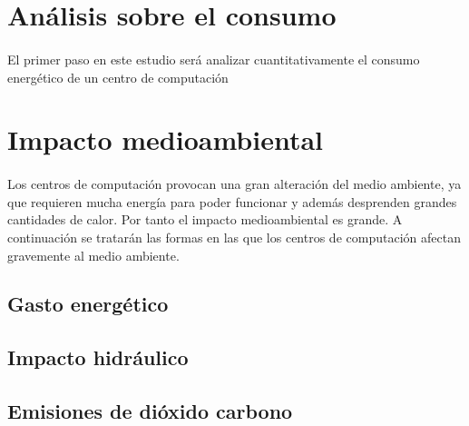 \documentclass[10pt]{article}
\begin{document}
    \section{Análisis sobre el consumo}
    \label{sec:analisis}
    	\paragraph{}
		El primer paso en este estudio será analizar cuantitativamente el consumo energético de un centro de computación

    \section{Impacto medioambiental}
	\label{sec:impacto}

        \paragraph{}
		Los centros de computación provocan una gran alteración del medio ambiente, ya que requieren mucha energía para poder funcionar y además desprenden grandes cantidades de calor. Por tanto el impacto medioambiental es grande. A continuación se tratarán las formas en las que los centros de computación afectan gravemente al medio ambiente.
        
        \subsection{Gasto energético}
        	\paragraph{}
        
        \subsection{Impacto hidráulico}
        	\paragraph{}
            
        \subsection{Emisiones de dióxido carbono}
        	\paragraph{}
            
\end{document}

